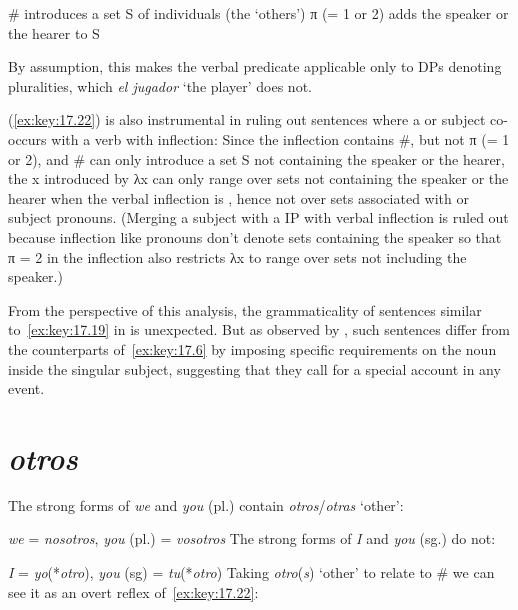 \documentclass[output=paper]{langsci/langscibook}
\begin{document}
\begin{exe}
\exi{\eqref{ex:key:17.13}}
\begin{xlist}
     \# introduces a set S of individuals (the ‘others’)
     π (= 1 or 2) adds the speaker or the hearer to S
\end{xlist}
\end{exe}
By assumption, this makes the verbal predicate applicable only to DPs denoting
pluralities, which \emph{el jugador} ‘the player’ does not.

(\ref{ex:key:17.22}) is also instrumental in ruling out sentences where a \Fpl{}
or \Spl{} subject co-occurs with a verb with \Tpl{} inflection: Since the
\Tpl{} inflection contains \#, but not π (= 1 or 2), and \# can only introduce
a set S not containing the speaker or the hearer, the x introduced by λx can
only range over sets not containing the speaker or the hearer when the verbal
inflection is \Tpl{}, hence not over sets associated with \Fpl{} or \Spl{}
subject pronouns. (Merging a \Fpl{} subject with a IP with \Spl{} verbal
inflection is ruled out because \Spl{} inflection like \Spl{} pronouns don’t
denote sets containing the speaker so that π = 2 in the \Spl{} inflection also
restricts λx to range over sets not including the speaker.)

From the perspective of this analysis, the grammaticality of sentences similar
to~\eqref{ex:key:17.19} in  is unexpected. But as observed by
\textcite{Hoehn2016}, such sentences differ from the  counterparts
of~\eqref{ex:key:17.6} by imposing specific requirements on the noun inside the
singular subject, suggesting that they call for a special account in any event.

\section{\emph{otros}}\label{sec:key:17.5}

The strong forms of  \emph{we} and \emph{you} (pl.) contain
\emph{otros}/\emph{otras} ‘other’:

\ea\label{ex:key:17.24}
    \emph{we} = \emph{nosotros}, \emph{you} (pl.) = \emph{vosotros}
\z
The strong forms of \emph{I} and \emph{you} (sg.) do not:

\ea\label{ex:key:17.25}
    \emph{I} = \emph{yo}(*\emph{otro}), \emph{you} (sg) = \emph{tu}(*\emph{otro})
\z
Taking \emph{otro}(\emph{s}) `other' to relate to \# we can see it as an overt
reflex of~\eqref{ex:key:17.22}:
\end{document}
